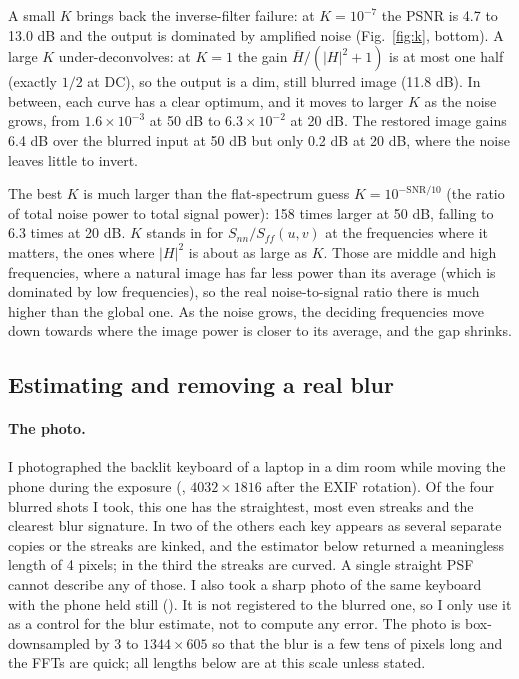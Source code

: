 A small $K$ brings back the inverse-filter failure: at $K=10^{-7}$ the PSNR is
4.7 to 13.0 dB and the output is dominated by amplified noise (Fig.~\ref{fig:k},
bottom). A large $K$ under-deconvolves: at $K=1$ the gain $\overline H/(|H|^2+1)$
is at most one half (exactly $1/2$ at DC), so the output is a dim, still blurred
image (11.8 dB). In between, each curve has a clear optimum, and it moves to
larger $K$ as the noise grows, from $1.6\times10^{-3}$ at 50 dB to
$6.3\times10^{-2}$ at 20 dB. The restored image gains 6.4 dB over the blurred
input at 50 dB but only 0.2 dB at 20 dB, where the noise leaves little to invert.

The best $K$ is much larger than the flat-spectrum guess $K=10^{-\text{SNR}/10}$
(the ratio of total noise power to total signal power): 158 times larger at
50 dB, falling to 6.3 times at 20 dB. $K$ stands in for $S_{nn}/S_{ff}(u,v)$ at
the frequencies where it matters, the ones where $|H|^2$ is about as large as
$K$. Those are middle and high frequencies, where a natural image has far less
power than its average (which is dominated by low frequencies), so the real
noise-to-signal ratio there is much higher than the global one. As the noise
grows, the deciding frequencies move down towards where the image power is
closer to its average, and the gap shrinks.

\subsection{Estimating and removing a real blur}

\paragraph{The photo.} I photographed the backlit keyboard of a laptop in a dim
room while moving the phone during the exposure (,
$4032\times1816$ after the EXIF rotation). Of the four blurred shots I took, this
one has the straightest, most even streaks and the clearest blur signature. In two
of the others each key appears as several separate copies or the streaks are
kinked, and the estimator below returned a meaningless length of 4 pixels; in the
third the streaks are curved. A single straight PSF cannot describe any of those.
I also took a sharp photo of the same keyboard with the phone held still
(). It is not registered to the blurred
one, so I only use it as a control for the blur estimate, not to compute any
error. The photo is box-downsampled by 3 to $1344\times605$ so that the blur is a
few tens of pixels long and the FFTs are quick; all lengths below are at this
scale unless stated.

